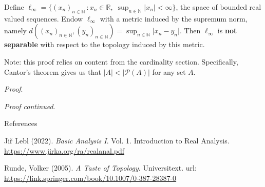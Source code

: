 \documentclass [aspectratio=169]{beamer}
\newcommand{\R}{{\mathbb{R}}}
\newcommand{\N}{{\mathbb{N}}}
\newcommand{\cP}{\mathcal{P}}
\begin{document}
\begin{frame}
\begin{example}
Define $\ell_\infty=\{ (x_n)_{n\in \N} \, : x_n \in \R , \; \sup_{n\in \N} \vert x_n \vert <\infty \}$, the space of bounded real valued sequences. Endow $\ell_\infty$ with a metric induced by the supremum norm, namely $d((x_n)_{n\in \N}, (y_n)_{n\in \N}) = \sup_{n\in \N} \vert x_n-y_n\vert$. 
Then $\ell_\infty$ is \textbf{not separable} with respect to the topology induced by this metric. 
\end{example}

\vspace{0.5em}
Note: this proof relies on content from the cardinality section. Specifically, Cantor's theorem gives us that $|A| < |\cP(A)|$ for any set $A$.

\vspace{0.5em}
\textit{Proof}.
\vspace{2.5cm}

\end{frame}


\begin{frame}
\textit{Proof continued}.
\vspace{7cm}

\end{frame}







\begin{frame}{References}

Ji\v{r} Lebl (2022). \textit{Basic Analysis I}. Vol. 1. Introduction to Real Analysis.  \href{ https://www.jirka.org/ra/realanal.pdf}{https://www.jirka.org/ra/realanal.pdf} 

\vspace{1em}


Runde, Volker (2005). \textit{A Taste of Topology}. Universitext.  url:  \href{https://link.springer.com/book/10.1007/0-387-28387-0}{https://link.springer.com/book/10.1007/0-387-28387-0} 


\end{frame}
\end{document}
